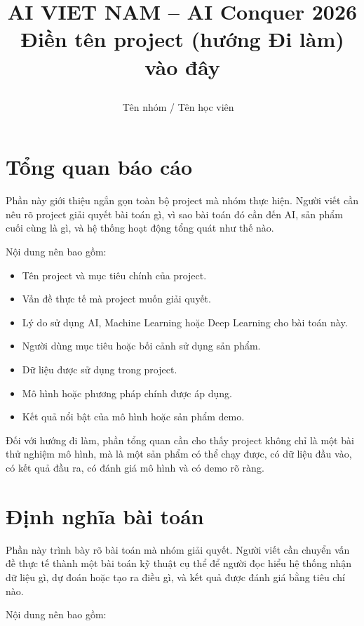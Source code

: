 \documentclass[12pt]{ai_conquer2026}
\title{%
  \begin{center}
        \Large {AI VIET NAM -- AI Conquer 2026}\\[.5ex]  
        \Huge \textbf{Điền tên project (hướng Đi làm) vào đây}\\[.5ex]
  \end{center}
}
\author{
\begin{minipage}{\textwidth}
\centering
{
\vspace{-1.5em}
Tên nhóm / Tên học viên
}\
\end{minipage}
}
\date{}
\begin{document}
\maketitle
\vspace{-5.5em}
\setlength{\epigraphwidth}{0.6\textwidth}

\section{Tổng quan báo cáo}

Phần này giới thiệu ngắn gọn toàn bộ project mà nhóm thực hiện. Người viết cần nêu rõ project giải quyết bài toán gì, vì sao bài toán đó cần đến AI, sản phẩm cuối cùng là gì, và hệ thống hoạt động tổng quát như thế nào.

Nội dung nên bao gồm:
\begin{itemize}
\item Tên project và mục tiêu chính của project.
\item Vấn đề thực tế mà project muốn giải quyết.
\item Lý do sử dụng AI, Machine Learning hoặc Deep Learning cho bài toán này.
\item Người dùng mục tiêu hoặc bối cảnh sử dụng sản phẩm.
\item Dữ liệu được sử dụng trong project.
\item Mô hình hoặc phương pháp chính được áp dụng.
\item Kết quả nổi bật của mô hình hoặc sản phẩm demo.
\end{itemize}

Đối với hướng đi làm, phần tổng quan cần cho thấy project không chỉ là một bài thử nghiệm mô hình, mà là một sản phẩm có thể chạy được, có dữ liệu đầu vào, có kết quả đầu ra, có đánh giá mô hình và có demo rõ ràng.

\newpage
\setcounter{tocdepth}{2}
\tableofcontents
\thispagestyle{fancy}

\newpage
\section{Định nghĩa bài toán}

Phần này trình bày rõ bài toán mà nhóm giải quyết. Người viết cần chuyển vấn đề thực tế thành một bài toán kỹ thuật cụ thể để người đọc hiểu hệ thống nhận dữ liệu gì, dự đoán hoặc tạo ra điều gì, và kết quả được đánh giá bằng tiêu chí nào.

Nội dung nên bao gồm:
\end{document}
